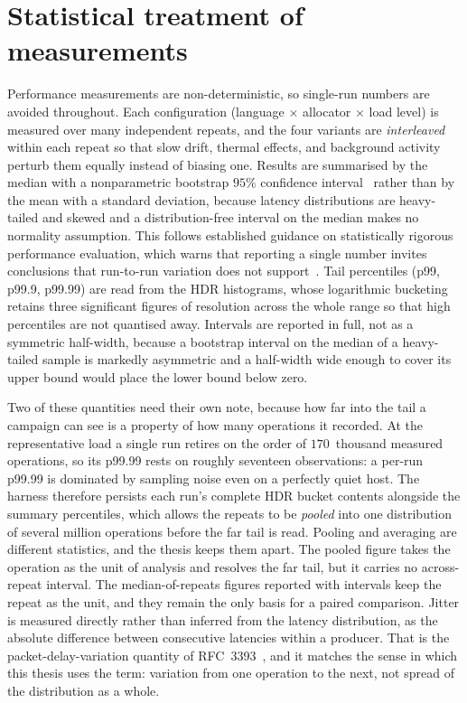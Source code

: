\documentclass[english,twoside,openright,a4paper,censored,csm,software-track-2020]{HYthesisML}
\begin{document}
\section{Statistical treatment of measurements}\label{sec:stats}
Performance measurements are non-deterministic, so single-run numbers are avoided throughout.
Each configuration (language $\times$ allocator $\times$ load level) is measured over many
independent repeats, and the four variants are \emph{interleaved} within each repeat so that
slow drift, thermal effects, and background activity perturb them equally instead of biasing
one. Results are summarised by the median with a nonparametric bootstrap $95\%$ confidence
interval~\cite{efron1993bootstrap} rather than by the mean with a standard deviation, because
latency distributions are
heavy-tailed and skewed and a distribution-free interval on the median makes no normality
assumption. This follows established guidance on statistically rigorous performance evaluation,
which warns that reporting a single number invites conclusions that run-to-run variation does
not support~\cite{georges2007rigorous}. Tail percentiles (p99, p99.9, p99.99) are read from the
HDR histograms, whose logarithmic bucketing retains three significant figures of resolution
across the whole range so that high percentiles are not quantised away. Intervals are reported
in full, not as a symmetric half-width, because a bootstrap interval on the median of a
heavy-tailed sample is markedly asymmetric and a half-width wide enough to cover its upper
bound would place the lower bound below zero.

Two of these quantities need their own note, because how far into the tail a campaign can see
is a property of how many operations it recorded. At the representative load a single run
retires on the order of $170$~thousand measured operations, so its p99.99 rests on roughly
seventeen observations: a per-run p99.99 is dominated by sampling noise even on a perfectly
quiet host. The harness therefore persists each run's complete HDR bucket contents alongside
the summary percentiles, which allows the repeats to be \emph{pooled} into one distribution of
several million operations before the far tail is read. Pooling and averaging are different
statistics, and the thesis keeps them apart. The pooled figure takes the operation as the unit
of analysis and resolves the far tail, but it carries no across-repeat interval. The
median-of-repeats figures reported with intervals keep the repeat as the unit, and they remain the
only basis for a paired comparison. Jitter is measured directly rather than inferred from the
latency distribution, as the absolute difference between consecutive latencies within a
producer. That is the packet-delay-variation quantity of RFC~3393~\cite{rfc3393}, and it matches the sense in
which this thesis uses the term: variation from one operation to the next, not spread of the
distribution as a whole.
\end{document}
